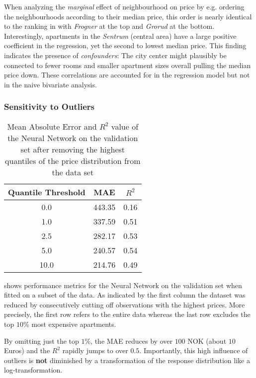 When analyzing the \emph{marginal} effect of neighbourhood on price by e.g. ordering the neighbourhoods according to their median price, this order is nearly identical to the ranking in  with \emph{Frogner} at the top and \emph{Grorud} at the bottom.
Interestingly, apartments in the \emph{Sentrum} (central area) have a large positive coefficient in the regression, yet the second to lowest median price.
This finding indicates the presence of \emph{confounders}:
The city center might plausibly be connected to fewer rooms and smaller apartment sizes overall pulling the median price down.
These correlations are accounted for in the regression model but not in the naive bivariate analysis.


\subsubsection{Sensitivity to Outliers} \label{outliers}

\begin{table}[t]
  \centering
  \begin{tabular}{@{}ccc@{}}
    \toprule
    Quantile Threshold & MAE    & $R^2$ \\ \midrule
    0.0                & 443.35 & 0.16  \\
    1.0                & 337.59 & 0.51  \\
    2.5                & 282.17 & 0.53  \\
    5.0                & 240.57 & 0.54  \\
    10.0               & 214.76 & 0.49  \\ \bottomrule
  \end{tabular}
  \caption{Mean Absolute Error and $R^2$ value of the Neural Network on the validation set after removing the highest quantiles of the price distribution from the data set}
  \label{tab:mlp-outliers}
\end{table}

 shows performance metrics for the Neural Network on the validation set when fitted on a subset of the data.
As indicated by the first column the dataset was reduced by consecutively cutting off observations with the highest prices.
More precisely, the first row refers to the entire data whereas the last row excludes the top $10$\% most expensive apartments.

By omitting just the top $1$\%, the MAE reduces by over $100$ NOK (about $10$ Euros) and the $R^2$ rapidly jumps to over $0.5$.
Importantly, this high influence of outliers is \textbf{not} diminished by a transformation of the response distribution like a log-transformation.

